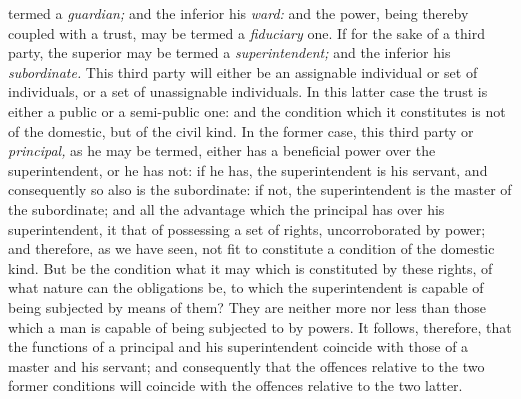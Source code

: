 \documentclass[12pt]{report}
\begin{document}
termed a \emph{guardian;} and the inferior his \emph{ward:} and the
power, being thereby coupled with a trust, may be termed a
\emph{fiduciary} one. If for the sake of a third party, the superior may
be termed a \emph{superintendent;} and the inferior his
\emph{subordinate.} This third party will either be an assignable
individual or set of individuals, or a set of unassignable individuals.
In this latter case the trust is either a public or a semi-public one:
and the condition which it constitutes is not of the domestic, but of
the civil kind. In the former case, this third party or
\emph{principal,} as he may be termed, either has a beneficial power
over the superintendent, or he has not: if he has, the superintendent is
his servant, and consequently so also is the subordinate: if not, the
superintendent is the master of the subordinate; and all the advantage
which the principal has over his superintendent, it that of possessing a
set of rights, uncorroborated by power; and therefore, as we have seen,
not fit to constitute a condition of the domestic kind. But be the
condition what it may which is constituted by these rights, of what
nature can the obligations be, to which the superintendent is capable of
being subjected by means of them? They are neither more nor less than
those which a man is capable of being subjected to by powers. It
follows, therefore, that the functions of a principal and his
superintendent coincide with those of a master and his servant; and
consequently that the offences relative to the two former conditions
will coincide with the offences relative to the two latter.
\end{document}
